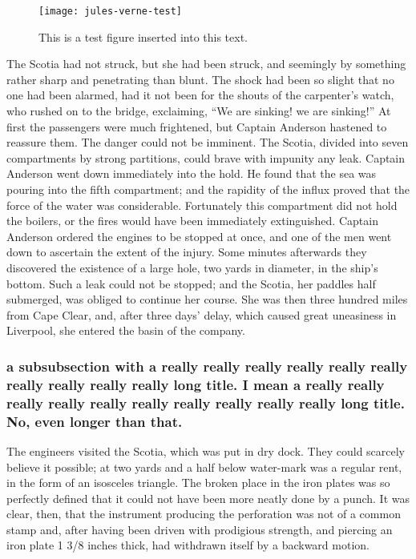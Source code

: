 \begin{figure}%
  \centering
  \texttt{[image: jules-verne-test]}%
  \caption[A test figure. This is a test figure inserted into this text.  This is a test figure inserted into this text.  This is a test figure inserted into this text.]
  {This is a test figure inserted into this text.}%
  \label{fig:test1}%
\end{figure}

The Scotia had not struck, but she had been struck, and seemingly
by something rather sharp and penetrating than blunt.
The shock had been so slight that no one had been alarmed,
had it not been for the shouts of the carpenter's watch,
who rushed on to the bridge, exclaiming, ``We are sinking! we
are sinking!''  At first the passengers were much frightened,
but Captain Anderson hastened to reassure them.  The danger could
not be imminent.  The Scotia, divided into seven compartments
by strong partitions, could brave with impunity any leak.
Captain Anderson went down immediately into the hold.
He found that the sea was pouring into the fifth compartment;
and the rapidity of the influx proved that the force of the water
was considerable.  Fortunately this compartment did not hold
the boilers, or the fires would have been immediately extinguished.
Captain Anderson ordered the engines to be stopped at once,
and one of the men went down to ascertain the extent of the injury.
Some minutes afterwards they discovered the existence of a
large hole, two yards in diameter, in the ship's bottom.
Such a leak could not be stopped; and the Scotia, her paddles
half submerged, was obliged to continue her course.  She was then
three hundred miles from Cape Clear, and, after three days' delay,
which caused great uneasiness in Liverpool, she entered the basin
of the company.

\subsubsection{a subsubsection with a really really really really really really really really really really long title. I mean a really really really really really really really really really really long title. No, even longer than that.}

The engineers visited the Scotia, which was put in dry dock.
They could scarcely believe it possible; at two yards and a half below
water-mark was a regular rent, in the form of an isosceles triangle.
The broken place in the iron plates was so perfectly defined
that it could not have been more neatly done by a punch.
It was clear, then, that the instrument producing the perforation
was not of a common stamp and, after having been driven with
prodigious strength, and piercing an iron plate 1 3/8 inches thick,
had withdrawn itself by a backward motion.

